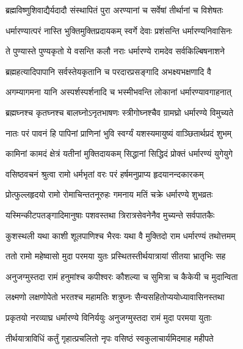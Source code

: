 \twolineshloka
{ब्रह्मविष्णुशिवाद्यैर्यदादौ संस्थापितं पुरा}
{अरण्यानां च सर्वेषां तीर्थानां च विशेषतः}%

\twolineshloka
{धर्मारण्यात्परं नास्ति भुक्तिमुक्तिप्रदायकम्}
{स्वर्गे देवाः प्रशंसन्ति धर्मारण्यनिवासिनः}%

\twolineshloka
{ते पुण्यास्ते पुण्यकृतो ये वसन्ति कलौ नराः}
{धर्मारण्ये रामदेव सर्वकिल्बिषनाशने}%

\twolineshloka
{ब्रह्महत्यादिपापानि सर्वस्तेयकृतानि च}
{परदारप्रसङ्गादि अभक्ष्यभक्षणादि वै}%

\twolineshloka
{अगम्यागमना यानि अस्पर्शस्पर्शनादि च}
{भस्मीभवन्ति लोकानां धर्मारण्यावगाहनात्}%

\twolineshloka
{ब्रह्मघ्नश्च कृतघ्नश्च बालघ्नोऽनृतभाषणः}
{स्त्रीगोघ्नश्चैव ग्रामघ्रो धर्मारण्ये विमुच्यते}%

\twolineshloka
{नातः परं पावनं हि पापिनां प्राणिनां भुवि}
{स्वर्ग्यं यशस्यमायुष्यं वाञ्छितार्थप्रदं शुभम्}%

\twolineshloka
{कामिनां कामदं क्षेत्रं यतीनां मुक्तिदायकम्}
{सिद्धानां सिद्धिदं प्रोक्तं धर्मारण्यं युगेयुगे}%


\twolineshloka
{वसिष्ठवचनं श्रुत्वा रामो धर्मभृतां वरः}
{परं हर्षमनुप्राप्य हृदयानन्दकारकम्}%

\twolineshloka
{प्रोत्फुल्लहृदयो रामो रोमाचिन्ततनूरुहः}
{गमनाय मतिं चक्रे धर्मारण्ये शुभव्रतः}%

\twolineshloka
{यस्मिन्कीटपतङ्गादिमानुषाः पशवस्तथा}
{त्रिरात्रसेवनेनैव मुच्यन्ते सर्वपातकैः}%

\twolineshloka
{कुशस्थली यथा काशी शूलपाणिश्च भैरवः}
{यथा वै मुक्तिदो राम धर्मारण्यं तथोत्तमम्}%

\twolineshloka
{ततो रामो महेष्वासो मुदा परमया युतः}
{प्रस्थितस्तीर्थयात्रायां सीतया भ्रातृभिः सह}%

\twolineshloka
{अनुजग्मुस्तदा रामं हनुमांश्च कपीश्वरः}
{कौशल्या च सुमित्रा च कैकेयी च मुदान्विता}%

\twolineshloka
{लक्ष्मणो लक्षणोपेतो भरतश्च महामतिः}
{शत्रुघ्नः सैन्यसहितोप्ययोध्यावासिनस्तथा}%

\twolineshloka
{प्रकृतयो नरव्याघ्र धर्मारण्ये विनिर्ययुः}
{अनुजग्मुस्तदा रामं मुदा परमया युताः}%

\twolineshloka
{तीर्थयात्राविधिं कर्तुं गृहात्प्रचलितो नृपः}
{वसिष्ठं स्वकुलाचार्यमिदमाह महीपते}%


